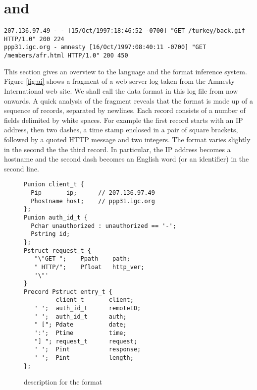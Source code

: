 \section{\pads{} and \learnpads{}} 
\label{sec:review}

\begin{figure*}[th]
{\small \begin{verbatim}
207.136.97.49 - - [15/Oct/1997:18:46:52 -0700] "GET /turkey/back.gif HTTP/1.0" 200 224
ppp31.igc.org - amnesty [16/Oct/1997:08:40:11 -0700] "GET /members/afr.html HTTP/1.0" 200 450
\end{verbatim}                  
}
\caption{A fragment from a web server log in \ai{} format}\label{fig:ai}
\end{figure*}

This section gives an overview to the \pads{} language and the \learnpads{}
format inference system. Figure \ref{fig:ai} shows a fragment of a web server
log taken from the Amnesty International web site. We shall call the data format 
in this log file \ai{} from now onwards. A quick analysis of the fragment reveals
that the \ai{} format is made up of a sequence of records, separated by newlines.
Each record consists of a number of fields delimited by white spaces. For example
the first record starts with an IP address, then two dashes, a time stamp enclosed in
a pair of square brackets, followed by a quoted HTTP message and two integers.
The format varies slightly in the second the the third record. In particular,
the IP address becomes a hostname and the second dash becomes an English word 
(or an identifier) in the second line. 

\begin{figure}[th]
{\small \begin{verbatim}
Punion client_t {
  Pip       ip;      // 207.136.97.49
  Phostname host;    // ppp31.igc.org 
};
Punion auth_id_t {
  Pchar unauthorized : unauthorized == '-'; 
  Pstring id;                        
};
Pstruct request_t {
   "\"GET ";    Ppath    path;
   " HTTP/";    Pfloat   http_ver; 
   '\"'
}
Precord Pstruct entry_t {
         client_t       client;          
   ' ';  auth_id_t      remoteID;        
   ' ';  auth_id_t      auth;            
   " ["; Pdate          date;   
   ':';  Ptime          time;     
   "] "; request_t      request;         
   ' ';  Pint           response;     
   ' ';  Pint           length; 
};
\end{verbatim}
}
\caption{\padsc{} description for the \ai{} format}
\label{fig:ai.p}
\end{figure}

